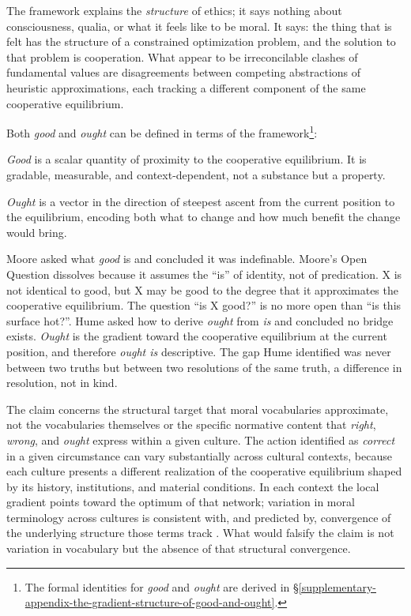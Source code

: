 \documentclass[11pt]{article}
\theoremstyle{plain}
\theoremstyle{definition}
\theoremstyle{remark}
\begin{document}
The framework explains the \emph{structure} of ethics; it says nothing
about consciousness, qualia, or what it feels like to be moral. It says:
the thing that is felt has the structure of a constrained optimization
problem, and the solution to that problem is cooperation. What appear to
be irreconcilable clashes of fundamental values are disagreements
between competing abstractions of heuristic approximations, each
tracking a different component of the same cooperative equilibrium.

Both \emph{good} and \emph{ought} can be defined in terms of the
framework\footnote{The formal identities for \emph{good} and
  \emph{ought} are derived in
  §\ref{supplementary-appendix-the-gradient-structure-of-good-and-ought}.}:

\emph{Good} is a scalar quantity of proximity to the cooperative
equilibrium. It is gradable, measurable, and context-dependent, not a
substance but a property.

\emph{Ought} is a vector in the direction of steepest ascent from the
current position to the equilibrium, encoding both what to change and
how much benefit the change would bring.

Moore asked what \emph{good} is and concluded it was indefinable.
Moore's Open Question dissolves because it assumes the ``is'' of
identity, not of predication. X is not identical to good, but X may be
good to the degree that it approximates the cooperative equilibrium. The
question ``is X good?'' is no more open than ``is this surface hot?''.
Hume asked how to derive \emph{ought} from \emph{is} and concluded no
bridge exists. \emph{Ought} is the gradient toward the cooperative
equilibrium at the current position, and therefore \emph{ought is}
descriptive. The gap Hume identified was never between two truths but
between two resolutions of the same truth, a difference in resolution,
not in kind.

The claim concerns the structural target that moral vocabularies
approximate, not the vocabularies themselves or the specific normative
content that \emph{right}, \emph{wrong}, and \emph{ought} express within
a given culture. The action identified as \emph{correct} in a given
circumstance can vary substantially across cultural contexts, because
each culture presents a different realization of the cooperative
equilibrium shaped by its history, institutions, and material
conditions. In each context the local gradient points toward the optimum
of that network; variation in moral terminology across cultures is
consistent with, and predicted by, convergence of the underlying
structure those terms track \citep{Haidt2010, Haidt2003}. What would
falsify the claim is not variation in vocabulary but the absence of that
structural convergence.
\end{document}
